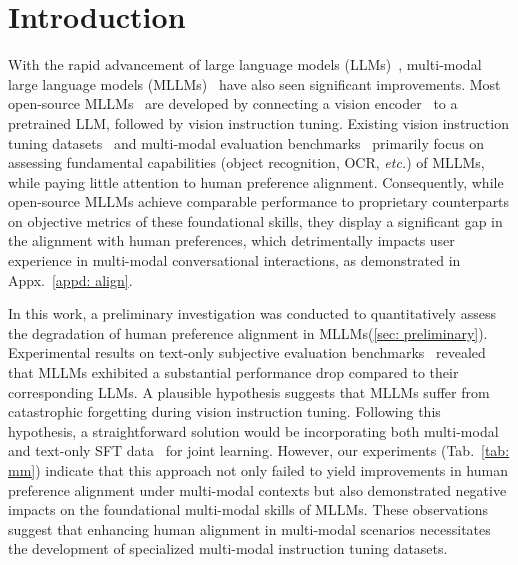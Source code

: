 \section{Introduction}

With the rapid advancement of large language models (LLMs)~\cite{2022chatgpt,touvron2023llama2},  multi-modal large language models (MLLMs)~\cite{OpenAI2023GPT4TR,team2023gemini} have also seen significant improvements. 
Most open-source MLLMs~\cite{liu2023visual,chen2023internvl} are developed by 
connecting a vision encoder~\cite{dosovitskiy2020image} to a pretrained LLM,
followed by vision instruction tuning.
Existing vision instruction tuning datasets~\cite{liu2023visual,chen2023sharegpt4v,chen2024allava} and 
multi-modal evaluation benchmarks~\cite{liu2023mmbench,yue2023mmmu,lu2023mathvista} primarily focus on assessing fundamental capabilities (object recognition, OCR, \emph{etc.}) of MLLMs,
while paying little attention to human preference alignment.
Consequently, 
while open-source MLLMs achieve comparable performance to proprietary counterparts on objective metrics of these foundational skills,
they display a significant gap in the alignment with human preferences, 
which detrimentally impacts user experience in multi-modal conversational interactions, as demonstrated in Appx.~\ref{appd: align}.
%

In this work, 
a preliminary investigation was conducted to quantitatively assess the degradation of human preference alignment in MLLMs(\cref{sec: preliminary}). 
Experimental results on text-only subjective evaluation benchmarks~\cite{dubois2024length,li2024crowdsourced}
revealed that MLLMs exhibited a substantial performance drop compared to their corresponding LLMs. 
A plausible hypothesis suggests that MLLMs suffer from catastrophic forgetting during vision instruction tuning. 
Following this hypothesis, a straightforward solution would be incorporating both multi-modal and text-only SFT data~\cite{xu2024magpie,cao2025condor,ding2023enhancing} for joint learning. 
However, our experiments (Tab.~\ref{tab: mm}) indicate that this approach not only failed to yield improvements
in human preference alignment under multi-modal contexts but also demonstrated negative impacts on the foundational multi-modal skills of MLLMs. 
These observations suggest that enhancing human alignment in multi-modal scenarios necessitates the development of specialized multi-modal instruction tuning datasets.

